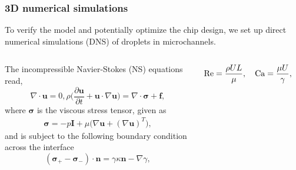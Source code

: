 \begin{frame}
  \frametitle{3D numerical simulations}

  To verify the model and potentially optimize the chip design, we set up direct numerical simulations (DNS) of droplets in microchannels.
  \vskip0.3cm

  \pause
  \begin{columns}[T]

    \begin{column}{0.55\textwidth}
      \begin{bluecolorbox}
        The incompressible Navier-Stokes (NS) equations read,
        \begin{subequations} \label{eq:Navier-Sotkes}
          \begin{equation}
            \nabla \cdot {\bm u} = 0,
            \label{eq:div-free}
          \end{equation}
          \begin{equation}
            \rho \bigg(\frac{\partial {\bm u}}{\partial t} + {\bm u} \cdot \nabla {\bm u} \bigg) = \nabla \cdot {\bm \sigma} + {\bm f},
            \label{eq:NS}
          \end{equation}
        \end{subequations}
        where $\bm \sigma$ is the viscous stress tensor, given as
        \begin{equation}
          \begin{aligned}
            {\bm \sigma} = -p {\bm I}+ \mu \bigg( \nabla {\bm u} + (\nabla {\bm u})^T \bigg),
          \end{aligned}
        \end{equation}
        and is subject to the following boundary condition across the interface
        \begin{equation} \label{eq:stress-bc}
          ({\bm \sigma}_+ - {\bm \sigma}_- ) \cdot {\bm n} = \gamma \kappa {\bm n} - \nabla \gamma,
        \end{equation}
      \end{bluecolorbox}
    \end{column}

    \pause
    \begin{column}{0.4\textwidth}
      \centering
      \begin{bluecolorbox}
        \begin{equation} \notag
          \begin{aligned}
            \textrm{Re} = \frac{\rho UL}{\mu}, \quad
            \textrm{Ca} = \frac{\mu U}{\gamma}, \quad
            \textrm{Fr} = \frac{U^2}{FL}.  
          \end{aligned}
        \end{equation}
      \end{bluecolorbox}
      \vskip0.2cm


\end{column}
\end{columns}
\end{frame}

